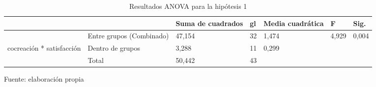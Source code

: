 \begin{table}[h]
    \caption {Resultados ANOVA para la hipótesis 1}
	\label{tab:anovaH1}
	\setlength\extrarowheight{5pt}
	
	\begin{tabular}{p{2.1cm} p{4.1cm} p{1.8cm} p{0.9cm} p{1.8cm} p{0.9cm} p{1.0cm}}
	\toprule
			&						& Suma de cuadrados	& gl	& Media cuadrática	& F	& Sig. \\
	\midrule
			& Entre grupos (Combinado)		& 47,154	& 32	& 1,474	& 4,929	& 0,004 \\
	cocreación * satisfacción	& Dentro de grupos	& 3,288	& 11	& 0,299	&	& \\
			& Total							& 50,442	& 43 \\
	\bottomrule
	\end{tabular}
	
	\center
	\footnotesize
	Fuente: elaboración propia
\end{table}
